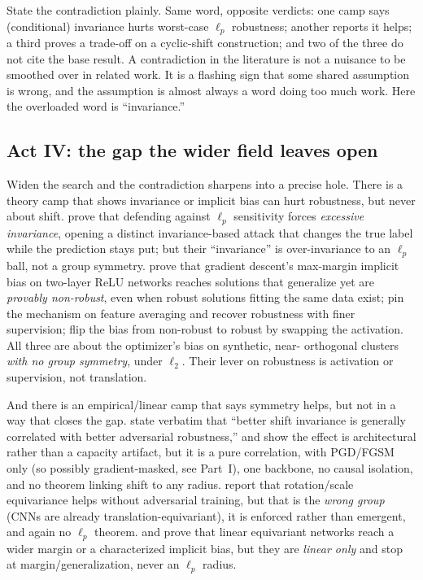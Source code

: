 State the contradiction plainly. Same word, opposite verdicts: one camp says (conditional)
invariance hurts worst-case $\ell_p$ robustness; another reports it helps; a third proves a
trade-off on a cyclic-shift construction; and two of the three do not cite the base result. A
contradiction in the literature is not a nuisance to be smoothed over in related work. It is a
flashing sign that some shared assumption is wrong, and the assumption is almost always a word doing
too much work. Here the overloaded word is ``invariance.''

\subsection{Act IV: the gap the wider field leaves open}
\label{sub:p2-act4}

Widen the search and the contradiction sharpens into a precise hole. There is a theory camp that
shows invariance or implicit bias can hurt robustness, but never about shift. \citet{tramer2020}
prove that defending against $\ell_p$ sensitivity forces \emph{excessive invariance}, opening a
distinct invariance-based attack that changes the true label while the prediction stays put; but
their ``invariance'' is over-invariance to an $\ell_p$ ball, not a group symmetry.
\citet{frei2023} prove that gradient descent's max-margin implicit bias on two-layer ReLU networks
reaches solutions that generalize yet are \emph{provably non-robust}, even when robust solutions
fitting the same data exist; \citet{li2025feature} pin the mechanism on feature averaging and
recover robustness with finer supervision; \citet{minvidal2024} flip the bias from non-robust to
robust by swapping the activation. All three are about the optimizer's bias on synthetic, near-
orthogonal clusters \emph{with no group symmetry}, under $\ell_2$. Their lever on robustness is
activation or supervision, not translation.

And there is an empirical/linear camp that says symmetry helps, but not in a way that closes the
gap. \citet{sahagokhale2024} state verbatim that ``better shift invariance is generally correlated
with better adversarial robustness,'' and show the effect is architectural rather than a capacity
artifact, but it is a pure correlation, with PGD/FGSM only (so possibly gradient-masked, see
Part~I), one backbone, no causal isolation, and no theorem linking shift to any radius.
\citet{wang2025bridging} report that rotation/scale equivariance helps without adversarial training,
but that is the \emph{wrong group} (CNNs are already translation-equivariant), it is enforced rather
than emergent, and again no $\ell_p$ theorem. \citet{chenzhu2023} and \citet{lawrence2021} prove
that linear equivariant networks reach a wider margin or a characterized implicit bias, but they
are \emph{linear only} and stop at margin/generalization, never an $\ell_p$ radius.

